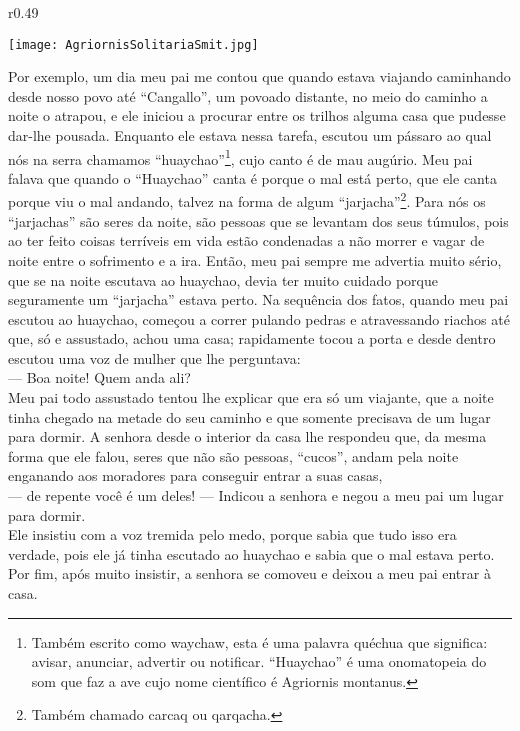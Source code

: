 \ifdefined\EnableIncludeImages
\begin{wrapfigure}{r}{0.49\textwidth}
  \begin{center}
  \vspace{-20pt}
    \texttt{[image: AgriornisSolitariaSmit.jpg]}
  \end{center}
  \vspace{-20pt}
\end{wrapfigure}
\fi
Por exemplo, um dia meu pai me contou que quando estava viajando caminhando desde nosso povo até ``Cangallo'', um povoado distante, no meio do caminho a noite o atrapou, e ele iniciou a procurar entre os trilhos alguma casa que pudesse dar-lhe pousada. Enquanto ele estava nessa tarefa, escutou um pássaro ao qual nós na serra chamamos ``huaychao''\footnote{Também escrito como waychaw, esta é uma palavra quéchua que significa: avisar, anunciar, advertir ou notificar. ``Huaychao'' é uma onomatopeia do som que faz a ave cujo nome científico é Agriornis montanus.}, cujo canto é de mau augúrio.
Meu pai falava que quando o ``Huaychao'' canta é porque o mal está perto, que ele canta porque viu o mal andando, talvez na forma de algum ``jarjacha''\footnote{Também chamado carcaq ou qarqacha.}. Para nós os ``jarjachas'' são seres da noite, são pessoas que se levantam dos seus túmulos, pois ao ter feito coisas terríveis em vida estão condenadas a não morrer e vagar de noite entre o sofrimento e a ira. 
Então, meu pai sempre me advertia muito sério, que se na noite escutava ao huaychao, devia ter muito cuidado porque seguramente um ``jarjacha'' estava perto. 
Na sequência dos fatos, quando meu pai escutou ao huaychao, começou a correr pulando pedras e atravessando riachos até que, só e assustado, achou uma casa; rapidamente tocou a porta e desde dentro escutou uma voz de mulher que lhe perguntava:\\\indent
--- Boa noite! Quem anda ali?\\\indent
Meu pai todo assustado tentou lhe explicar que era só um viajante, que a noite tinha chegado na metade do seu caminho e que somente precisava de um lugar para dormir. A senhora desde o interior da casa lhe respondeu que, da mesma forma que ele falou, seres que não são pessoas, ``cucos'', andam pela noite enganando aos moradores para conseguir entrar a suas casas,\\\indent
--- de repente você é um deles! --- Indicou a senhora e negou a meu pai um lugar para dormir.\\\indent
Ele insistiu com a voz tremida pelo medo, porque sabia que tudo isso era verdade, pois ele já tinha escutado ao huaychao e sabia que o mal estava perto. Por fim, após muito insistir, a senhora se comoveu e deixou a meu pai entrar à casa. 
